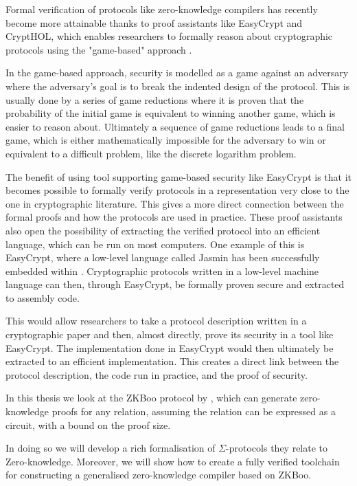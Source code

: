 \vspace{3mm}

Formal verification of protocols like zero-knowledge compilers has recently
become more attainable thanks to proof assistants like EasyCrypt and CryptHOL,
which enables researchers to formally reason about cryptographic protocols using the
"game-based" approach \cite{SOK:CAC}.

In the game-based approach, security is
modelled as a game against an adversary where the adversary's goal is to
break the indented design of the protocol.
This is usually done by a series of game reductions where it is proven that the
probability of the initial game is equivalent to winning another game, which is
easier to reason about.
Ultimately a sequence of game reductions leads to a final game, which is either
mathematically impossible for the adversary to win or equivalent to a
difficult problem, like the discrete logarithm problem.

The benefit of using tool supporting game-based security like EasyCrypt is that
it becomes possible to formally verify protocols in a representation very close
to the one in cryptographic literature. This gives a more direct connection between
the formal proofs and how the protocols are used in practice.
These proof assistants also open the possibility of extracting the verified
protocol into an efficient language, which can be run on most computers.
One example of this is EasyCrypt, where a low-level language called Jasmin has
been successfully embedded within \cite{easycrypt-jasmin}.
Cryptographic protocols written in a low-level machine language can
then, through EasyCrypt, be formally proven secure and extracted to assembly code.

This would allow researchers to take a protocol description written in a
cryptographic paper and then, almost directly, prove its security in a tool like EasyCrypt.
The implementation done in EasyCrypt would then ultimately be extracted to an efficient implementation.
This creates a direct link between the protocol description, the code run in
practice, and the proof of security.


In this thesis we look at the ZKBoo protocol by \citet{zkboo},
which can generate zero-knowledge proofs for any relation, assuming the relation
can be expressed as a circuit, with a bound on the proof size.

In doing so we will develop a rich formalisation of $\Sigma$-protocols they
relate to Zero-knowledge. Moreover, we will show how to create a fully verified
toolchain for constructing a generalised zero-knowledge compiler based on ZKBoo.

